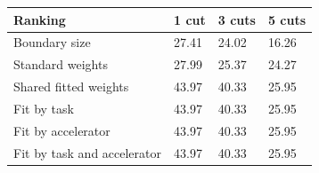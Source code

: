 \begin{tabular}{@{}llll@{}}
\toprule
Ranking & 1 cut & 3 cuts & 5 cuts \\
\midrule
Boundary size & 27.41 & 24.02 & 16.26 \\
Standard weights & 27.99 & 25.37 & 24.27 \\
Shared fitted weights & 43.97 & 40.33 & 25.95 \\
Fit by task & 43.97 & 40.33 & 25.95 \\
Fit by accelerator & 43.97 & 40.33 & 25.95 \\
Fit by task and accelerator & 43.97 & 40.33 & 25.95 \\
\bottomrule
\end{tabular}
